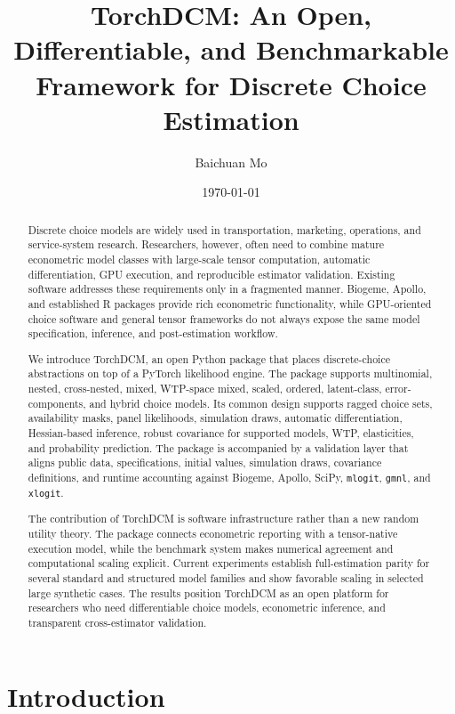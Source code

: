 \documentclass[11pt]{article}
\title{TorchDCM: An Open, Differentiable, and Benchmarkable Framework for Discrete Choice Estimation}
\author{Baichuan Mo}
\date{\today}
\begin{document}
\maketitle

\begin{abstract}
Discrete choice models are widely used in transportation, marketing, operations, and
service-system research. Researchers, however, often need to combine mature
econometric model classes with large-scale tensor computation, automatic
differentiation, GPU execution, and reproducible estimator validation. Existing
software addresses these requirements only in a fragmented manner. Biogeme,
Apollo, and established R packages provide rich econometric functionality, while
GPU-oriented choice software and general tensor frameworks do not always expose
the same model specification, inference, and post-estimation workflow.

We introduce TorchDCM, an open Python package that places discrete-choice
abstractions on top of a PyTorch likelihood engine. The package supports
multinomial, nested, cross-nested, mixed, WTP-space mixed, scaled, ordered,
latent-class, error-components, and hybrid choice models. Its common design
supports ragged choice sets, availability masks, panel likelihoods, simulation
draws, automatic differentiation, Hessian-based inference, robust covariance
for supported models, WTP, elasticities, and probability prediction. The package
is accompanied by a validation layer that aligns public data, specifications,
initial values, simulation draws, covariance definitions, and runtime accounting
against Biogeme, Apollo, SciPy, \texttt{mlogit}, \texttt{gmnl}, and \texttt{xlogit}.

The contribution of TorchDCM is software infrastructure rather than a new random
utility theory. The package connects econometric reporting with a tensor-native
execution model, while the benchmark system makes numerical agreement and
computational scaling explicit. Current experiments establish full-estimation
parity for several standard and structured model families and show favorable
scaling in selected large synthetic cases. The results position TorchDCM as an
open platform for researchers who need differentiable choice models, econometric
inference, and transparent cross-estimator validation.
\end{abstract}

\section{Introduction}
\label{sec:introduction}
\end{document}
